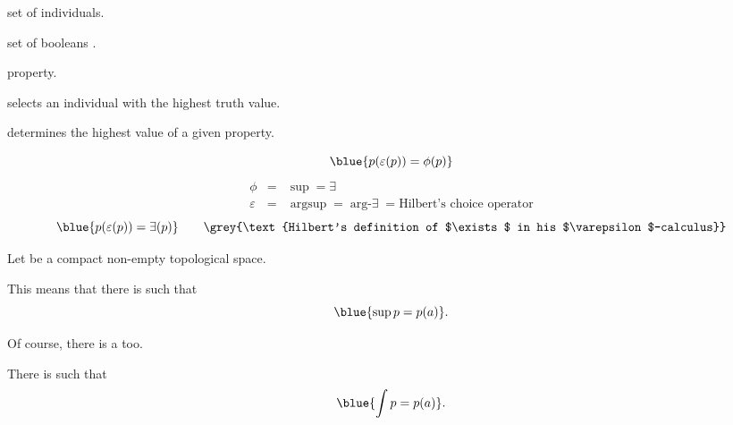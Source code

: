 \documentclass%
[%
Screen4to3,
]{foils}
\newcommand{\argsup}{\operatorname{argsup}}
\newcommand{\argexists}{\operatorname{arg-\exists}}
\newcommand{\false}{\operatorname{false}}
\newcommand{\true}{\operatorname{true}}
\begin{document}

\vspace{-2ex}

 set of individuals.

 set of booleans \blue{$\false = 0 < 1 = \true$}.

 property.

 selects
an individual with the highest truth value. 

determines the highest value of a given property. 

\vfill

\[
\blue{p(\varepsilon(p)) = \phi(p)}
\]
\begin{eqnarray*}
  \phi & = & \sup = \exists \\
  \varepsilon & = & \argsup = \argexists = \text{Hilbert's choice operator}
\end{eqnarray*}
\[
\blue{p(\varepsilon(p)) = \exists(p)} \qquad \grey{\text{Hilbert's definition of $\exists$ in his $\varepsilon$-calculus}}
\]


Let  be a compact non-empty topological space.

\vfill


\vfill

This means that there is  such that
\[
\blue{\sup p = p(a)}. 
\]

\vfill



\vfill

Of course, there is a  too.




\vfill

There is  such that
\[
\blue{\int p = p(a)}.
\]
\end{document}
